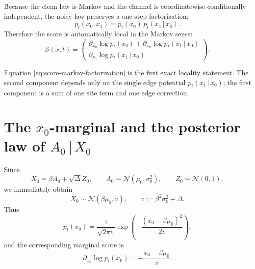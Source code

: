 \documentclass[11pt]{article}
\newcommand{\1}{\mathbf{1}}
\newcommand{\pt}{p_t}
\newcommand{\score}{\mathcal{S}}
\newcommand{\Normal}{\mathcal{N}}
\newcommand{\given}{\,|\,}
\theoremstyle{definition}
\begin{document}
Because the clean law is Markov and the channel is coordinatewise conditionally independent, the noisy law preserves a one-step factorization:
\begin{equation}
\label{eq:markov-factorization-noisy}
\pt(x_0,x_1)=\pt(x_0)\,\pt(x_1\given x_0).
\end{equation}
Therefore the score is automatically local in the Markov sense:
\begin{equation}
\label{eq:score-markov-factorization}
\score(x,t)
=
\begin{pmatrix}
\partial_{x_0}\log \pt(x_0) + \partial_{x_0}\log \pt(x_1\given x_0)\\[0.6em]
\partial_{x_1}\log \pt(x_1\given x_0)
\end{pmatrix}.
\end{equation}

Equation \eqref{eq:score-markov-factorization} is the first exact locality statement. The second component depends only on the single edge potential \(\pt(x_1\given x_0)\); the first component is a sum of one site term and one edge correction.

\section{The \(x_0\)-marginal and the posterior law of \(A_0\given X_0\)}

Since
\begin{equation}
X_0 = \beta A_0 + \sqrt{\Delta} Z_0,
\qquad
A_0\sim \Normal(\mu_0,\sigma_0^2),
\qquad
Z_0\sim \Normal(0,1),
\end{equation}
we immediately obtain
\begin{equation}
\label{eq:v-definition}
X_0\sim \Normal(\beta\mu_0,v),
\qquad
v := \beta^2 \sigma_0^2 + \Delta.
\end{equation}
Thus
\begin{equation}
\label{eq:px0}
\pt(x_0)=\frac{1}{\sqrt{2\pi v}}\exp\!\left(-\frac{(x_0-\beta\mu_0)^2}{2v}\right),
\end{equation}
and the corresponding marginal score is
\begin{equation}
\label{eq:px0-score}
\partial_{x_0}\log \pt(x_0) = -\frac{x_0-\beta\mu_0}{v}.
\end{equation}
\end{document}
